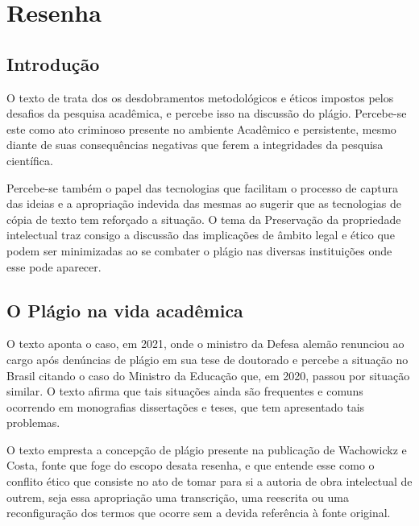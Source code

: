 \documentclass[
   article,       %
   12pt,          %
   oneside,       %
   a4paper,       %
   english,       %
   brazil,           %
   sumario=tradicional
   ]{abntex2}
\begin{document}

\frenchspacing 


\maketitle


\newpage

\textual
\section{Resenha}

\subsection{Introdução}

O texto de \cite{cap_4_plagio} trata dos os desdobramentos metodológicos e éticos impostos pelos desafios da pesquisa acadêmica, e percebe isso na discussão do plágio. Percebe-se este como ato criminoso presente no ambiente Acadêmico e persistente, mesmo diante de suas consequências negativas que ferem a integridades da pesquisa científica.

Percebe-se também o papel das tecnologias que facilitam o processo de captura das ideias e a apropriação indevida das mesmas ao sugerir que as tecnologias de cópia de texto tem reforçado a situação. O tema da Preservação da propriedade intelectual traz consigo a discussão das implicações de âmbito legal e ético que podem ser minimizadas ao se combater o plágio nas diversas instituições onde esse pode aparecer.


\subsection{O Plágio na vida acadêmica}

O texto aponta o caso, em 2021, onde o ministro da Defesa alemão renunciou ao cargo após denúncias de plágio em sua tese de doutorado e percebe a situação no Brasil citando o caso do Ministro da Educação que, em 2020, passou por situação similar. O texto afirma que tais situações ainda são frequentes e comuns ocorrendo em monografias dissertações e teses, que tem apresentado tais problemas.

O texto empresta a concepção de plágio presente na publicação de Wachowickz e Costa, fonte que foge do escopo desata resenha, e que entende esse como o conflito ético que consiste no ato de tomar para si a autoria de obra intelectual de outrem, seja essa apropriação uma transcrição, uma reescrita ou uma reconfiguração dos termos que ocorre sem a devida referência à fonte original.
\end{document}
